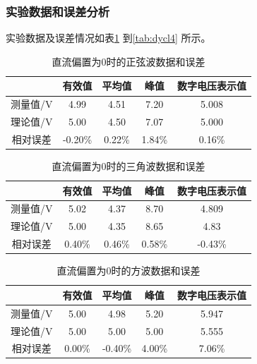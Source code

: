 \documentclass[12pt]{article}
\begin{document}
\subsubsection{实验数据和误差分析}
实验数据及误差情况如表\ref{tab:dycl1}
到\ref{tab:dycl4}
所示。
\begin{table}[htbp]
  \centering
  \caption{直流偏置为0时的正弦波数据和误差}
    \begin{tabular}{|c|c|c|c|c|}
    \hline
      & 有效值 & 平均值 & 峰值 & 数字电压表示值  \\
    \hline
    测量值/V & 4.99  & 4.51  & 7.20  & 5.008   \\
    \hline
    理论值/V & 5.00  & 4.50  & 7.07  & 5.000   \\
    \hline
    相对误差 & -0.20\% & 0.22\% & 1.84\% & 0.16\%  \\
    \hline
    \end{tabular}%
  \label{tab:dycl1}%
\end{table}%
\begin{table}[htbp]
  \centering
  \caption{直流偏置为0时的三角波数据和误差}
    \begin{tabular}{|c|c|c|c|c|}
    \hline
      & 有效值 & 平均值 & 峰值 & 数字电压表示值  \\
    \hline
    测量值/V & 5.02  & 4.37  & 8.70  & 4.809   \\
    \hline
    理论值/V & 5.00  & 4.35  & 8.65  & 4.83   \\
    \hline
    相对误差 & 0.40\% & 0.46\% & 0.58\% & -0.43\%  \\
    \hline
    \end{tabular}%
  \label{tab:dycl2}%
\end{table}%
\begin{table}[htbp]
  \centering
  \caption{直流偏置为0时的方波数据和误差}
    \begin{tabular}{|c|c|c|c|c|}
    \hline
      & 有效值 & 平均值 & 峰值 & 数字电压表示值  \\
    \hline
    测量值/V & 5.00  & 4.98  & 5.20  & 5.947   \\
    \hline
    理论值/V & 5.00  & 5.00  & 5.00  & 5.555   \\
    \hline
    相对误差 & 0.00\% & -0.40\% & 4.00\% & 7.06\%  \\
    \hline
    \end{tabular}%
  \label{tab:dycl3}%
\end{table}%
\end{document}
